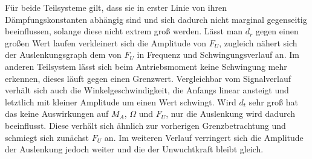 Für beide Teilsysteme gilt, dass sie in erster Linie von ihren Dämpfungskonstanten abhängig sind und sich dadurch nicht marginal gegenseitig beeinflussen, solange diese nicht extrem groß werden. Lässt man $d_r$ gegen einen großen Wert laufen verkleinert sich die Amplitude von $F_U$, zugleich nähert sich der Auslenkungsgraph dem von $F_U$ in Frequenz und Schwingungsverlauf an. Im anderen Teilsystem lässt sich beim Antriebsmoment keine Schwingung mehr erkennen, dieses läuft gegen einen Grenzwert. Vergleichbar vom Signalverlauf verhält sich auch die Winkelgeschwindigkeit, die Anfangs linear ansteigt und letztlich mit kleiner Amplitude um einen Wert schwingt. Wird $d_t$ sehr groß hat das keine Auswirkungen auf $M_A$, $\Omega$ und $F_U$, nur die Auslenkung wird dadurch beeinflusst. Diese verhält sich ähnlich zur vorherigen Grenzbetrachtung und schmiegt sich zunächst $F_U$ an. Im weiteren Verlauf verringert sich die Amplitude der Auslenkung jedoch weiter und die der Unwuchtkraft bleibt gleich.